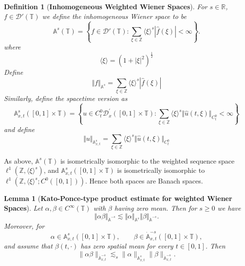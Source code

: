 \documentclass[12pt,reqno,letterpaper]{amsart}
\numberwithin{equation}{section}
\newcommand{\1}{{\bf 1}}
\newcommand{\2}{{\bf 2}}
\newcommand{\A}{\mathbb A}
\newcommand{\R}{\mathbb R}
\newcommand{\T}{\mathbb T}
\newcommand{\Z}{\mathbb Z}
\newcommand{\norm}[1]{ \Vert #1 \Vert}
\newtheorem{definition}[theorem]{Definition}
\newtheorem{lemma}[theorem]{Lemma}
\theoremstyle{remark}
\theoremstyle{remark}
\begin{document}
\begin{definition}[\textbf{Inhomogeneous Weighted Wiener Spaces}] For $s\in \R$, $f \in \mathcal{D}'(\T)$ we define the \textit{inhomogeneous Wiener space} to be
$$
\mathbb{A}^s(\T) = \left\{f \in \mathcal{D}'(\T) : \sum_{\xi \in \Z} \langle \xi\rangle^{s}|\hat{f}(\xi)| < \infty\right\}.
$$
where 
\[\langle \xi\rangle = (1 + |\xi|^2)^{\frac{1}{2}}\]
Define 
\[\norm{f}_{\A^{s}} =\sum_{\xi \in \Z} \langle \xi\rangle^{s}|\hat{f}(\xi)|\]
Similarly, define the spacetime version as 
   $$
\mathbb{A}_{x,t}^{s}([0,1] \times \T) = \left\{u \in C_t^0\mathcal{D}^\prime_x([0, 1] \times \T) :  \sum_{\xi \in \Z} \langle \xi\rangle^s \Vert \hat{u}(t,\xi) \Vert_{C_t^0} < \infty\right\}
$$ and define 
\[\norm{u}_{\mathbb{A}_{x,t}^{s}} = \sum_{\xi \in \Z} \langle\xi\rangle^s \Vert \hat{u}(t,\xi) \Vert_{C_t^0}\]
\end{definition}
As above, \(\mathbb A^s(\mathbb T)\) is isometrically isomorphic to the
weighted sequence space
\(\ell^1(\mathbb Z,\langle\xi\rangle^s)\), and
\(\mathbb A_{x,t}^s([0,1]\times\mathbb T)\) is isometrically isomorphic to
\(\ell^1(\mathbb Z,\langle\xi\rangle^s;C^0([0,1]))\). Hence both spaces are
Banach spaces.



\begin{lemma}[\textbf{Kato-Ponce-type product estimate for weighted Wiener Spaces}]\label{lem:pseudo_diff_cont_Wiener}
    Let $\alpha,\beta \in C^{\infty}(\T)$ with $\beta$ having zero mean. Then for $s \geq 0$ we have
    $$
        \Vert \alpha \beta \Vert_{\dot{\A}^{-s}} \lesssim \Vert \alpha \Vert_{\A^s} \Vert \beta \Vert_{\dot{\A}^{-s}}.
    $$
    Moreover, for 
\[
    \alpha\in \mathbb A_{x,t}^{s}([0,1]\times\mathbb T),
    \qquad
    \beta\in \dot{\mathbb A}_{x,t}^{-s}([0,1]\times\mathbb T),
\]
and assume that \(\beta(t,\cdot)\) has zero spatial mean for every \(t\in[0,1]\). Then
\[
    \|\alpha\beta\|_{\dot{\mathbb A}_{x,t}^{-s}}
    \lesssim_s
    \|\alpha\|_{\mathbb A_{x,t}^{s}}
    \|\beta\|_{\dot{\mathbb A}_{x,t}^{-s}}.
\]
\end{lemma}
\end{document}
